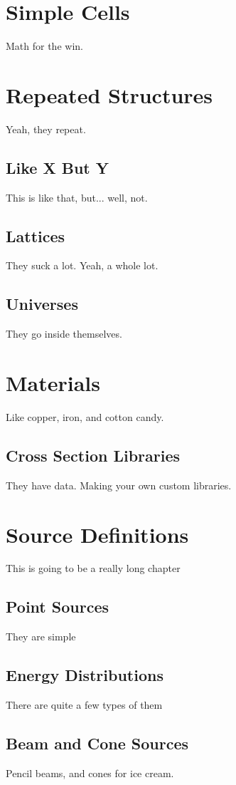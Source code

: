 \documentclass[10pt,a4paper]{book}
\begin{document}
\chapter{Simple Cells}
Math for the win.

\chapter{Repeated Structures}
Yeah, they repeat.

\section{Like X But Y}
This is like that, but... well, not.

\section{Lattices}
They suck a lot. Yeah, a whole lot.

\section{Universes}
They go inside themselves.

\chapter{Materials}
Like copper, iron, and cotton candy.

\section{Cross Section Libraries}
They have data. Making your own custom libraries.

\chapter{Source Definitions}
This is going to be a really long chapter

\section{Point Sources}
They are simple

\section{Energy Distributions}
There are quite a few types of them

\section{Beam and Cone Sources}
Pencil beams, and cones for ice cream.
\end{document}
